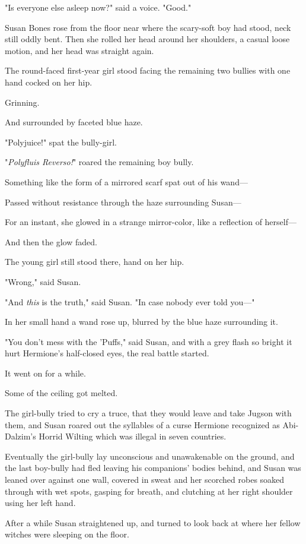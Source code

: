 "Is everyone else asleep now?" said a voice. "Good."

Susan Bones rose from the floor near where the scary-soft boy had stood, neck 
still oddly bent. Then she rolled her head around her shoulders, a casual loose 
motion, and her head was straight again.

The round-faced first-year girl stood facing the remaining two bullies with one 
hand cocked on her hip.

Grinning.

And surrounded by faceted blue haze.

"Polyjuice!" spat the bully-girl.

"\emph{Polyfluis Reverso!}" roared the remaining boy bully.

Something like the form of a mirrored scarf spat out of his wand---

Passed without resistance through the haze surrounding Susan---

For an instant, she glowed in a strange mirror-color, like a reflection of 
herself---

And then the glow faded.

The young girl still stood there, hand on her hip.

"Wrong," said Susan.

"And \emph{this} is the truth," said Susan. "In case nobody ever told you---"

In her small hand a wand rose up, blurred by the blue haze surrounding it.

"You don't mess with the 'Puffs," said Susan, and with a grey flash so bright 
it hurt Hermione's half-closed eyes, the real battle started.

It went on for a while.

Some of the ceiling got melted.

The girl-bully tried to cry a truce, that they would leave and take Jugson with 
them, and Susan roared out the syllables of a curse Hermione recognized as 
Abi-Dalzim's Horrid Wilting which was illegal in seven countries.

Eventually the girl-bully lay unconscious and unawakenable on the ground, and 
the last boy-bully had fled leaving his companions' bodies behind, and Susan 
was leaned over against one wall, covered in sweat and her scorched robes 
soaked through with wet spots, gasping for breath, and clutching at her right 
shoulder using her left hand.

After a while Susan straightened up, and turned to look back at where her 
fellow witches were sleeping on the floor.

